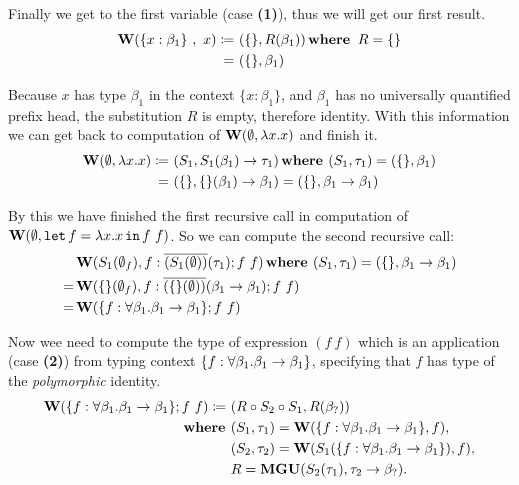 \documentclass[a4paper,oneside]{memoir}
\begin{document}
Finally we get to the first variable (case \textbf{(1)}), thus we will get our first result.
\begin{align*}
\operatorname{\textbf{W}}(\{x : \beta_1 \}~,~ x) \coloneqq ~ & ( \{\}, R(\beta_1) ) \operatorname{\textbf{where~}}  R = \{\} \\
                              = ~ & ( \{\}, \beta_1 )
\end{align*}

Because $x$ has type $\beta_1$ in the context $\{x : \beta_1\}$, and $\beta_1$ has no universally quantified prefix head, the substitution $R$ is empty, therefore identity. With this information we can get back to computation of $\operatorname{\textbf{W}}(\emptyset, \lambda x .x)$ and finish it. 
\begin{align*}
\operatorname{\textbf{W}}(\emptyset, \lambda x . x) \coloneqq ~ & (S_1, S_1(\beta_1) \rightarrow \tau_1 ) \operatorname{\textbf{where~}} (S_1, \tau_1) = ( \{\}, \beta_1 ) \\
 = ~ & (\{\}, \{\}(\beta_1) \rightarrow \beta_1 ) = (\{\}, \beta_1 \rightarrow \beta_1 )
\end{align*}

By this we have finished the first recursive call in computation of \\
$\operatorname{\textbf{W}}(\emptyset, \texttt{let} \, f = \lambda x . x \, \texttt{in} \, f~f)$. So we can compute the second recursive call:
\begin{align*}
& \operatorname{\textbf{W}}(S_1(\emptyset_f),f:\overline{(S_1(\emptyset))}(\tau_1); f~f) \operatorname{\textbf{where~}} (S_1, \tau_1) = (\{\}, \beta_1 \rightarrow \beta_1 ) \\
= & \operatorname{\textbf{W}}(\{\}(\emptyset_f),f:\overline{(\{\}(\emptyset))}(\beta_1 \rightarrow \beta_1); f~f) \\
= & \operatorname{\textbf{W}}(\{f:\forall \beta_1 . \beta_1 \rightarrow \beta_1 \}; f~f)
\end{align*}

Now wee need to compute the type of expression $(f~f)$ which is an application (case \textbf{(2)}) from typing context $\{f:\forall \beta_1 . \beta_1 \rightarrow \beta_1 \}$, specifying that $f$ has type of the \textit{polymorphic} identity. 
\begin{align*}
\operatorname{\textbf{W}}(\{f:\forall \beta_1 . \beta_1 \rightarrow \beta_1 \}; f~f) \coloneqq ~ & 
(R \circ S_2 \circ S_1, R(\beta_?) ) \\
\operatorname{\textbf{where~}} & (S_1, \tau_1) = \operatorname{\textbf{W}}(\{f:\forall \beta_1 . \beta_1 \rightarrow \beta_1 \}, f), \\
       & (S_2, \tau_2) = \operatorname{\textbf{W}}(S_1(\{f:\forall \beta_1 . \beta_1 \rightarrow \beta_1 \}), f), \\
       & R = \operatorname{\textbf{MGU}}( S_2(\tau_1), \tau_2 \rightarrow \beta_? ).\\
\end{align*}
\end{document}
